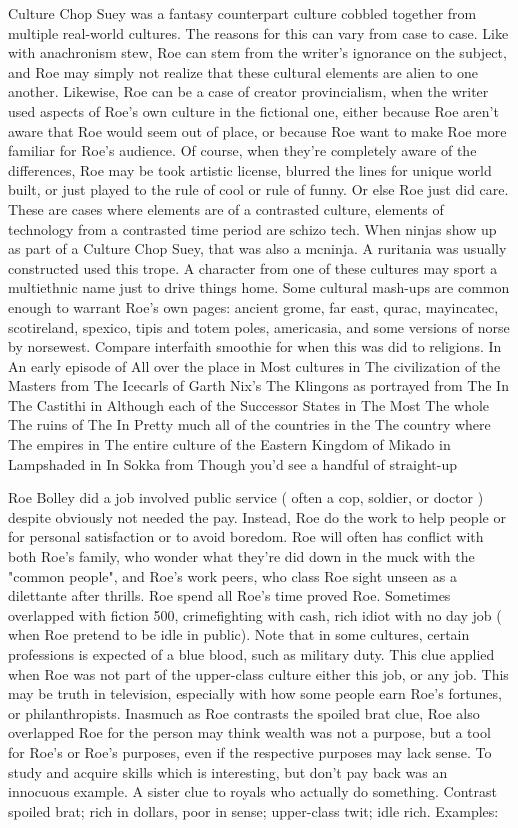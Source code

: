 \documentclass[12pt]{book}
\begin{document}
Culture Chop Suey was a fantasy counterpart culture cobbled together from multiple real-world cultures. The reasons for this can vary from case to case. Like with anachronism stew, Roe can stem from the writer's ignorance on the subject, and Roe may simply not realize that these cultural elements are alien to one another. Likewise, Roe can be a case of creator provincialism, when the writer used aspects of Roe's own culture in the fictional one, either because Roe aren't aware that Roe would seem out of place, or because Roe want to make Roe more familiar for Roe's audience. Of course, when they're completely aware of the differences, Roe may be took artistic license, blurred the lines for unique world built, or just played to the rule of cool or rule of funny. Or else Roe just did care. These are cases where elements are of a contrasted culture, elements of technology from a contrasted time period are schizo tech. When ninjas show up as part of a Culture Chop Suey, that was also a mcninja. A ruritania was usually constructed used this trope. A character from one of these cultures may sport a multiethnic name just to drive things home. Some cultural mash-ups are common enough to warrant Roe's own pages: ancient grome, far east, qurac, mayincatec, scotireland, spexico, tipis and totem poles, americasia, and some versions of norse by norsewest. Compare interfaith smoothie for when this was did to religions. In An early episode of All over the place in Most cultures in The civilization of the Masters from The Icecarls of Garth Nix's The Klingons as portrayed from The In The Castithi in Although each of the Successor States in The Most The whole The ruins of The In Pretty much all of the countries in the The country where The empires in The entire culture of the Eastern Kingdom of Mikado in Lampshaded in In Sokka from Though you'd see a handful of straight-up



Roe Bolley did a job involved public service ( often a cop, soldier, or doctor ) despite obviously not needed the pay. Instead, Roe do the work to help people or for personal satisfaction  or to avoid boredom. Roe will often has conflict with both Roe's family, who wonder what they're did down in the muck with the "common people", and Roe's work peers, who class Roe sight unseen as a dilettante after thrills. Roe spend all Roe's time proved Roe. Sometimes overlapped with fiction 500, crimefighting with cash, rich idiot with no day job ( when Roe pretend to be idle in public). Note that in some cultures, certain professions is expected of a blue blood, such as military duty. This clue applied when Roe was not part of the upper-class culture  either this job, or any job. This may be truth in television, especially with how some people earn Roe's fortunes, or philanthropists. Inasmuch as Roe contrasts the spoiled brat clue, Roe also overlapped Roe for the person may think wealth was not a purpose, but a tool for Roe's or Roe's purposes, even if the respective purposes may lack sense. To study and acquire skills which is interesting, but don't pay back was an innocuous example. A sister clue to royals who actually do something. Contrast spoiled brat; rich in dollars, poor in sense; upper-class twit; idle rich. Examples:
\end{document}
